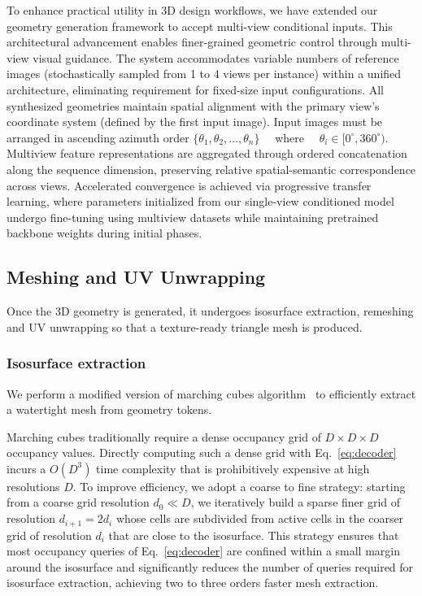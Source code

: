To enhance practical utility in 3D design workflows, we have extended our geometry generation framework to accept multi-view conditional inputs. This architectural advancement enables finer-grained geometric control through multi-view visual guidance. The system accommodates variable numbers of reference images (stochastically sampled from 1 to 4 views per instance) within a unified architecture, eliminating requirement for fixed-size input configurations. All synthesized geometries maintain spatial alignment with the primary view's coordinate system (defined by the first input image). Input images must be arranged in ascending azimuth order $\{\theta_1, \theta_2, \ldots, \theta_n\} \quad$ where $\quad \theta_i \in [0^\circ, 360^\circ)$. Multiview feature representations are aggregated through ordered concatenation along the sequence dimension, preserving relative spatial-semantic correspondence across views. Accelerated convergence is achieved via progressive transfer learning, where parameters initialized from our single-view conditioned model undergo fine-tuning using multiview datasets while maintaining pretrained backbone weights during initial phases.

\subsection{Meshing and UV Unwrapping} %
Once the 3D geometry is generated, it undergoes isosurface extraction, remeshing and UV unwrapping so that a texture-ready triangle mesh is produced.

\subsubsection{Isosurface extraction}
We perform a modified version of marching cubes algorithm~\cite{lorensen1998marching,nielson2003marching} to efficiently extract a watertight mesh from geometry tokens.

Marching cubes traditionally require a dense occupancy grid of $D\times D \times D$ occupancy values. Directly computing such a dense grid with Eq.~\eqref{eq:decoder} incurs a $O(D^3)$ time complexity that is prohibitively expensive at high resolutions $D$. To improve efficiency, we adopt a coarse to fine strategy: starting from a coarse grid resolution $d_0\ll D$, we iteratively build a sparse finer grid of resolution $d_{i+1}=2 d_i$ whose cells are subdivided from active cells in the coarser grid of resolution $d_i$ that are close to the isosurface. This strategy ensures that most occupancy queries of Eq.~\eqref{eq:decoder} are confined within a small margin around the isosurface and significantly reduces the number of queries required for isosurface extraction, achieving two to three orders faster mesh extraction. 

